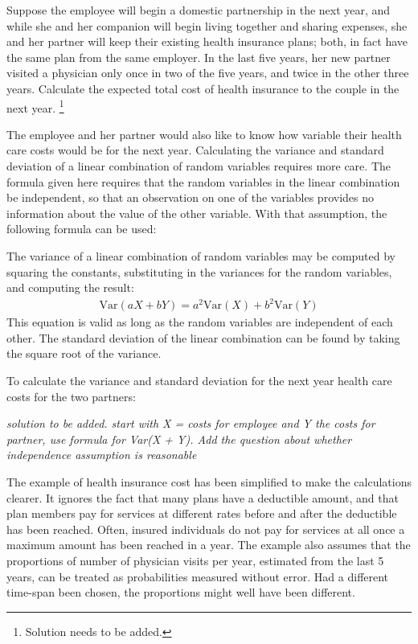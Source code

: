 \begin{exercise} \label{healthCareCostsPartner}
	Suppose the employee will begin a domestic partnership in the next year, and while she and her companion will begin living together and sharing expenses, she and her partner will keep their existing health insurance plans; both, in fact have the same plan from the same employer.  In the last five years, her new partner visited a physician only once in two of the five years, and twice in the other three years.   Calculate the expected total cost of health insurance to the couple in the next year. \footnote{Solution needs to be added.}
\end{exercise}

The employee and her partner would also like to know how variable their health care costs would be for the next year.  Calculating the variance and standard deviation of a linear combination of random variables requires more care.  The formula given here requires that the random variables in the linear combination be independent, so that an observation on one of the variables provides no information about the value of the other variable.  With that assumption, the following formula can be used:

\begin{termBox}{
The variance of a linear combination of random variables may be computed by squaring the constants, substituting in the variances for the random variables, and computing the result:
\begin{align*}
\text{Var}(aX + bY) = a^2 \text{Var}(X) + b^2\text{Var}(Y)
\end{align*}
This equation is valid as long as the random variables are independent of each other. The standard deviation of the linear combination can be found by taking the square root of the variance.}
\end{termBox}

To calculate the variance and standard deviation for the next year health care costs for the two partners:

\textit{solution to be added.  start with X = costs for employee and Y the costs for partner, use formula for Var(X + Y). Add the question about whether independence assumption is reasonable}

The example of health insurance cost has been simplified to make the calculations clearer.  It ignores the fact that many plans have a deductible amount, and that plan members pay for services at different rates before and after the deductible has been reached. Often, insured individuals do not pay for services at all once a maximum amount has been reached in a year. The example also assumes that the proportions of number of physician visits per year, estimated from the last 5 years, can be treated as probabilities measured without error.  Had a different time-span been chosen, the proportions might well have been different.  

